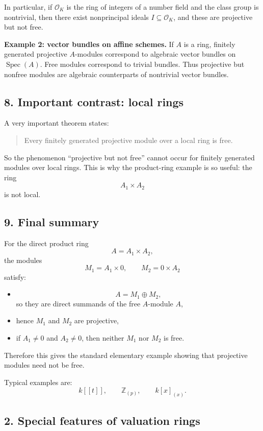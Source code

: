 \documentclass[12pt,a4paper]{article}
\theoremstyle{notespace}
\begin{document}
In particular, if \(\mathcal O_K\) is the ring of integers of a number field and the class group is nontrivial, then there exist nonprincipal ideals \(I\subseteq \mathcal O_K\), and these are projective but not free.

\medskip

\textbf{Example 2: vector bundles on affine schemes.}
If \(A\) is a ring, finitely generated projective \(A\)-modules correspond to algebraic vector bundles on \(\operatorname{Spec}(A)\). Free modules correspond to trivial bundles. Thus projective but nonfree modules are algebraic counterparts of nontrivial vector bundles.

\subsection{8. Important contrast: local rings}

A very important theorem states:

\begin{quote}
	Every finitely generated projective module over a local ring is free.
\end{quote}

So the phenomenon ``projective but not free'' cannot occur for finitely generated modules over local rings. This is why the product-ring example is so useful: the ring
\[
A_1\times A_2
\]
is not local.

\subsection{9. Final summary}

For the direct product ring
\[
A=A_1\times A_2,
\]
the modules
\[
M_1=A_1\times 0,
\qquad
M_2=0\times A_2
\]
satisfy:
\begin{itemize}
	\item
	\[
	A=M_1\oplus M_2,
	\]
	so they are direct summands of the free \(A\)-module \(A\),
	\item hence \(M_1\) and \(M_2\) are projective,
	\item if \(A_1\neq 0\) and \(A_2\neq 0\), then neither \(M_1\) nor \(M_2\) is free.
\end{itemize}

Therefore this gives the standard elementary example showing that projective modules need not be free.

Typical examples are:
\[
k[[t]],\qquad \mathbb Z_{(p)},\qquad k[x]_{(x)}.
\]

\subsection{2. Special features of valuation rings}
\end{document}
